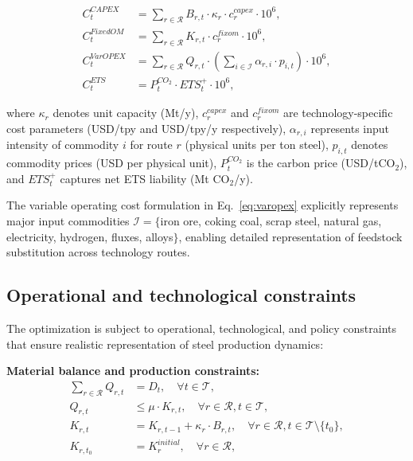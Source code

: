 \documentclass[preprint,1p,authoryear]{elsarticle}
\begin{document}
\begin{align}
C^{CAPEX}_t &= \sum_{r \in \mathcal{R}} B_{r,t} \cdot \kappa_r \cdot c^{capex}_r \cdot 10^6, \label{eq:capex}\\
C^{FixedOM}_t &= \sum_{r \in \mathcal{R}} K_{r,t} \cdot c^{fixom}_r \cdot 10^6, \label{eq:fixom}\\
C^{VarOPEX}_t &= \sum_{r \in \mathcal{R}} Q_{r,t} \cdot \left( \sum_{i \in \mathcal{I}} \alpha_{r,i} \cdot p_{i,t} \right) \cdot 10^6, \label{eq:varopex}\\
C^{ETS}_t &= P^{CO_2}_t \cdot ETS_t^+ \cdot 10^6, \label{eq:ets}
\end{align}

where $\kappa_r$ denotes unit capacity (Mt/y), $c^{capex}_r$ and $c^{fixom}_r$ are technology-specific cost parameters (USD/tpy and USD/tpy/y respectively), $\alpha_{r,i}$ represents input intensity of commodity $i$ for route $r$ (physical units per ton steel), $p_{i,t}$ denotes commodity prices (USD per physical unit), $P^{CO_2}_t$ is the carbon price (USD/tCO$_2$), and $ETS_t^+$ captures net ETS liability (Mt CO$_2$/y).

The variable operating cost formulation in Eq.~\eqref{eq:varopex} explicitly represents major input commodities $\mathcal{I} = \{$iron ore, coking coal, scrap steel, natural gas, electricity, hydrogen, fluxes, alloys$\}$, enabling detailed representation of feedstock substitution across technology routes.

\subsection{Operational and technological constraints}

The optimization is subject to operational, technological, and policy constraints that ensure realistic representation of steel production dynamics:

\textbf{Material balance and production constraints:}
\begin{align}
\sum_{r \in \mathcal{R}} Q_{r,t} &= D_t, \quad \forall t \in \mathcal{T}, \label{eq:demand}\\
Q_{r,t} &\le \mu \cdot K_{r,t}, \quad \forall r \in \mathcal{R}, t \in \mathcal{T}, \label{eq:utilization}\\
K_{r,t} &= K_{r,t-1} + \kappa_r \cdot B_{r,t}, \quad \forall r \in \mathcal{R}, t \in \mathcal{T} \setminus \{t_0\}, \label{eq:capacity}\\
K_{r,t_0} &= K_r^{initial}, \quad \forall r \in \mathcal{R}, \label{eq:initial}
\end{align}
\end{document}
